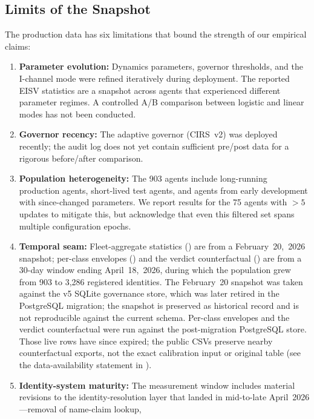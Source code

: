 \documentclass[11pt,twocolumn]{article}
\begin{document}
\subsection{Limits of the Snapshot}
\label{sec:limits-snapshot}

The production data has six limitations that bound the strength of
our empirical claims:
\begin{enumerate}
\item \textbf{Parameter evolution:} Dynamics parameters, governor
  thresholds, and the I-channel mode were refined iteratively during
  deployment. The reported EISV statistics are a snapshot across agents
  that experienced different parameter regimes. A controlled A/B
  comparison between logistic and linear modes has not been conducted.
\item \textbf{Governor recency:} The adaptive governor (CIRS~v2) was
  deployed recently; the audit log does not yet contain sufficient
  pre/post data for a rigorous before/after comparison.
\item \textbf{Population heterogeneity:} The 903 agents include
  long-running production agents, short-lived test agents, and agents
  from early development with since-changed parameters. We report
  results for the 75 agents with $>5$ updates to mitigate this, but
  acknowledge that even this filtered set spans multiple configuration
  epochs.
\item \textbf{Temporal seam:} Fleet-aggregate statistics
  () are from a February~20,~2026 snapshot;
  per-class envelopes () and the
  verdict counterfactual () are
  from a 30-day window ending April~18,~2026, during which the
  population grew from 903 to 3{,}286 registered identities.
  The February~20 snapshot was taken against the v5 SQLite governance
  store, which was later retired in the PostgreSQL
  migration; the snapshot is preserved as historical record and is
  not reproducible against the current schema. Per-class envelopes
  and the verdict counterfactual were run against the post-migration
  PostgreSQL store. Those live rows have since expired; the public
  CSVs preserve nearby counterfactual exports, not the exact
  calibration input or original table (see the data-availability
  statement in ).
\item \textbf{Identity-system maturity:} The measurement window
  includes material revisions to the identity-resolution layer that
  landed in mid-to-late April~2026---removal of name-claim lookup,

\end{enumerate}
\end{document}
